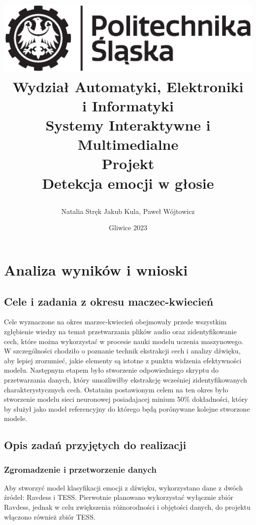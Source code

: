 \documentclass[12pt,titlepage]{article}
\title{
\includegraphics[scale=0.75]{img/politechnika_sl_logo_bw_poziom_pl.eps}\\
\textbf{Wydział Automatyki, Elektroniki\\
i Informatyki}\\
\vspace*{1cm}
Systemy Interaktywne i Multimedialne \\ Projekt \\ Detekcja emocji w głosie

\vspace*{5cm}
}
\author{
Natalia Stręk
Jakub Kula,
Paweł Wójtowicz
}
\date{Gliwice 2023}
\begin{document}
\maketitle


\newpage
\section{Analiza wyników i wnioski}
\subsection{Cele i zadania z okresu maczec-kwiecień}
Cele wyznaczone na okres marzec-kwiecień obejmowały przede wszystkim zgłębienie wiedzy na temat przetwarzania plików audio oraz zidentyfikowanie cech, które można wykorzystać w procesie nauki modelu uczenia maszynowego. W szczególności chodziło o poznanie technik ekstrakcji cech i analizy dźwięku, aby lepiej zrozumieć, jakie elementy są istotne z punktu widzenia efektywności modelu.
Następnym etapem było stworzenie odpowiedniego skryptu do przetwarzania danych, który umożliwiłby ekstrakcję wcześniej zidentyfikowanych charakterystycznych cech. Ostatnim postawionym celem na ten okres było stworzenie modelu sieci neuronowej posiadajacej minium 50\% dokładności, który by służył jako model referencyjny do którego będą porónywane kolejne stworzone modele.\\

\subsection{Opis zadań przyjętych do realizacji}
\subsubsection{Zgromadzenie i przetworzenie danych}
Aby stworzyć model klasyfikacji emocji z dźwięku, wykorzystano dane z dwóch źródeł: Ravdess i TESS. Pierwotnie planowano wykorzystać wyłącznie zbiór Ravdess, jednak w celu zwiększenia różnorodności i objętości danych, do projektu włączono również zbiór TESS.
\end{document}
